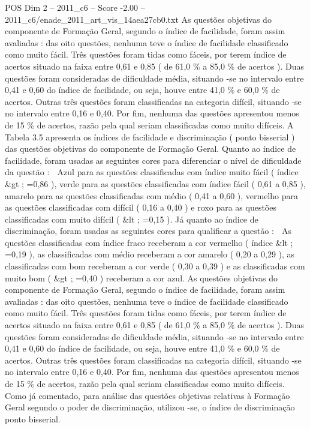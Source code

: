\begin{textsample}{POS Dim 2 – 2011\_c6 – Score -2.00 – 2011\_c6/enade\_2011\_art\_vis\_14aea27cb0.txt}
As questões objetivas do componente de Formação Geral, segundo o índice de facilidade, foram assim avaliadas : das oito questões, nenhuma teve o índice de facilidade classificado como muito fácil.
Três questões foram tidas como fáceis, por terem índice de acertos situado na faixa entre 0,61 e 0,85 ( de 61,0 \% a 85,0 \% de acertos ).
Duas questões foram consideradas de dificuldade média, situando -se no intervalo entre 0,41 e 0,60 do índice de facilidade, ou seja, houve entre 41,0 \% e 60,0 \% de acertos.
Outras três questões foram classificadas na categoria difícil, situando -se no intervalo entre 0,16 e 0,40.
Por fim, nenhuma das questões apresentou menos de 15 \% de acertos, razão pela qual seriam classificadas como muito difíceis.
A Tabela 3.5 apresenta os índices de facilidade e discriminação ( ponto bisserial ) das questões objetivas do componente de Formação Geral.
Quanto ao índice de facilidade, foram usadas as seguintes cores para diferenciar o nível de dificuldade da questão :  Azul para as questões classificadas com índice muito fácil ( índice \&gt ; =0,86 ), verde para as questões classificadas com índice fácil ( 0,61 a 0,85 ), amarelo para as questões classificadas com médio ( 0,41 a 0,60 ), vermelho para as questões classificadas com difícil ( 0,16 a 0,40 ) e roxo para as questões classificadas com muito difícil ( \&lt ; =0,15 ).
Já quanto ao índice de discriminação, foram usadas as seguintes cores para qualificar a questão :  As questões classificadas com índice fraco receberam a cor vermelho ( índice \&lt ; =0,19 ), as classificadas com médio receberam a cor amarelo ( 0,20 a 0,29 ), as classificadas com bom receberam a cor verde ( 0,30 a 0,39 ) e as classificadas com muito bom ( \&gt ; =0,40 ) receberam a cor azul.
As questões objetivas do componente de Formação Geral, segundo o índice de facilidade, foram assim avaliadas : das oito questões, nenhuma teve o índice de facilidade classificado como muito fácil.
Três questões foram tidas como fáceis, por terem índice de acertos situado na faixa entre 0,61 e 0,85 ( de 61,0 \% a 85,0 \% de acertos ).
Duas questões foram consideradas de dificuldade média, situando -se no intervalo entre 0,41 e 0,60 do índice de facilidade, ou seja, houve entre 41,0 \% e 60,0 \% de acertos.
Outras três questões foram classificadas na categoria difícil, situando -se no intervalo entre 0,16 e 0,40.
Por fim, nenhuma das questões apresentou menos de 15 \% de acertos, razão pela qual seriam classificadas como muito difíceis.
Como já comentado, para análise das questões objetivas relativas à Formação Geral segundo o poder de discriminação, utilizou -se, o índice de discriminação ponto bisserial.

\end{textsample}
